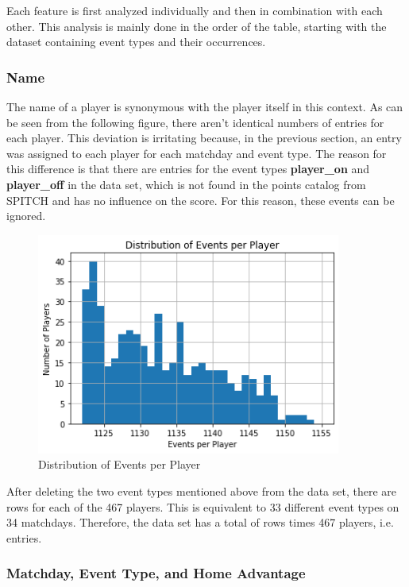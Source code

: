 Each feature is first analyzed individually and then in combination with each other. This analysis is mainly done in the order of the table, starting with the dataset containing event types and their occurrences.

\subsubsection{Name}

The name of a player is synonymous with the player itself in this context. As can be seen from the following figure, there aren't identical numbers of entries for each player. This deviation is irritating because, in the previous section, an entry was assigned to each player for each matchday and event type. The reason for this difference is that there are entries for the event types \textbf{player\_on} and \textbf{player\_off} in the data set, which is not found in the points catalog from SPITCH and has no influence on the score. For this reason, these events can be ignored.

\begin{figure}[H]
    \centering
    \label{fig:distribution_of_events_per_player}
    \includegraphics[width=10cm]{chapter/4_implementation/section/2_data/section/figures/distribution_of_events_per_player.png}
    \captionsetup{justification=centering}
    \caption{Distribution of Events per Player}
\end{figure}

After deleting the two event types mentioned above from the data set, there are  rows for each of the 467 players. This is equivalent to 33 different event types on 34 matchdays. Therefore, the data set has a total of  rows times 467 players, i.e.  entries. 

 \clearpage \subsubsection{Matchday, Event Type, and Home Advantage}

